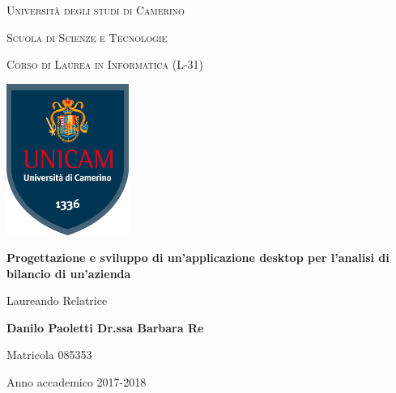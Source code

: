 \documentclass[12pt,a4paper]{report}
\begin{document}
    \begin{titlepage}
    
    	\centering
    	{\scshape\LARGE Università degli studi di Camerino \par}
    	
    	\vspace{0.5cm}
    	{\scshape\Large Scuola di Scienze e Tecnologie\par}
    	
    	\vspace{0.5cm}
    	{\scshape Corso di Laurea in Informatica (L-31)\par}
    	
    	\vspace{1cm}
    	\includegraphics[width=4cm]{unicam-scudo.png}\par\vspace{1cm}
    	{\huge\bfseries Progettazione e sviluppo di un'applicazione desktop per l'analisi di bilancio di un'azienda\par}
    	\vspace{2cm}
    	
    	{Laureando \hfill Relatrice \par}
    	{\bfseries \large Danilo Paoletti \hfill Dr.ssa Barbara Re \par}
    	{\small Matricola 085353 \hfill}
    
    	\vfill
    	
    	{\large Anno accademico 2017-2018\par}
    	
    \end{titlepage}
    
    \thispagestyle{empty}
    \clearpage\null\newpage
    
    \setcounter{page}{3}
    	
    \tableofcontents
    
    \clearpage\null\newpage
    
\end{document}
